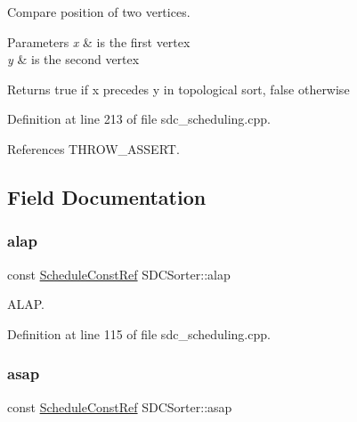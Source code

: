 Compare position of two vertices. 


\begin{DoxyParams}{Parameters}
{\em x} & is the first vertex \\
\hline
{\em y} & is the second vertex \\
\hline
\end{DoxyParams}
\begin{DoxyReturn}{Returns}
true if x precedes y in topological sort, false otherwise 
\end{DoxyReturn}


Definition at line 213 of file sdc\+\_\+scheduling.\+cpp.



References T\+H\+R\+O\+W\+\_\+\+A\+S\+S\+E\+RT.



\subsection{Field Documentation}
\mbox{\label{classSDCSorter_ac710ac9e206640b866366fb1b6e08bc7}} 
\subsubsection{\texorpdfstring{alap}{alap}}
{\footnotesize\ttfamily const \hyperlink{schedule_8hpp_a85e4dea8a1611026193d8ca13fc5a260}{Schedule\+Const\+Ref} S\+D\+C\+Sorter\+::alap\hspace{0.3cm}{\ttfamily [private]}}



A\+L\+AP. 



Definition at line 115 of file sdc\+\_\+scheduling.\+cpp.

\mbox{\label{classSDCSorter_a1dab096ae008e4596743d5f7ec66ac80}} 
\subsubsection{\texorpdfstring{asap}{asap}}
{\footnotesize\ttfamily const \hyperlink{schedule_8hpp_a85e4dea8a1611026193d8ca13fc5a260}{Schedule\+Const\+Ref} S\+D\+C\+Sorter\+::asap\hspace{0.3cm}{\ttfamily [private]}}



